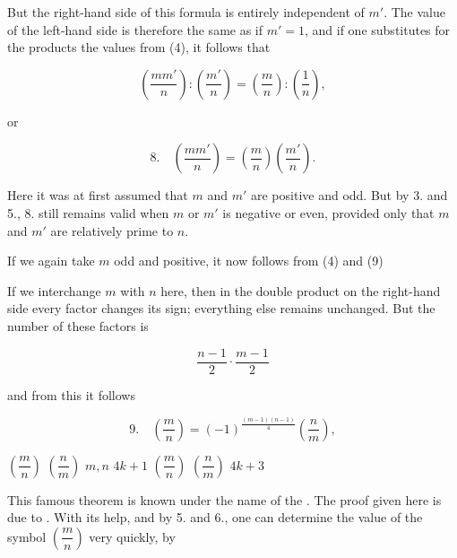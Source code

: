 But the right-hand side of this formula is entirely independent
of $m'$. The value of the left-hand side is therefore the same as if
$m' = 1$, and if one substitutes for the products the values from
(4), it follows that

\[
\left(\frac{mm'}{n}\right) : \left(\frac{m'}{n}\right) = \left(\frac{m}{n}\right) : \left(\frac{1}{n}\right),
\]

or

\[
8.\quad \left(\frac{mm'}{n}\right) = \left(\frac{m}{n}\right)\left(\frac{m'}{n}\right).
\]

Here it was at first assumed that $m$ and $m'$ are positive and
odd. But by 3. and 5., 8. still remains valid
when $m$ or $m'$ is negative or even, provided only that $m$ and $m'$
are relatively prime to $n$.

If we again take $m$ odd and positive, it now follows
from (4) and (9)


If we interchange $m$ with $n$ here, then in the
double product on the right-hand side every factor changes its sign;
everything else remains unchanged. But the number of these factors
is

\[
\frac{n-1}{2} \cdot \frac{m-1}{2}
\]

and from this it follows

\[
9.\quad \left(\frac{m}{n}\right) = (-1)^{\frac{(m-1)(n-1)}{4}} \left(\frac{n}{m}\right),
\]

 $\left(\dfrac{m}{n}\right)$  $\left(\dfrac{n}{m}\right)$ $m, n$ 
$4k+1$  $\left(\dfrac{m}{n}\right)$  $\left(\dfrac{n}{m}\right)$ $4k+3$

This famous theorem is known under the name of the .
 The proof given here is due to
. With its help, and by 5. and
6., one can determine the value of the symbol $\left(\dfrac{m}{n}\right)$ very quickly, by
